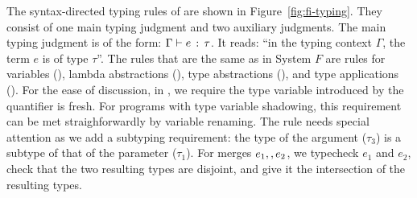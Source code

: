 The syntax-directed typing rules of \name are shown in
Figure~\ref{fig:fi-typing}. They consist of one main typing judgment and two
auxiliary judgments. The main typing judgment is of the form: $ \Gamma \vdash e \ \!:\! \ \tau $. It reads: ``in the typing context $\Gamma$, the term $e$ is of
type $\tau$''. The rules that are the same as in System $F$ are rules for
variables (), lambda abstractions (), type
abstractions (), and type applications (). For
the ease of discussion, in , we require the type variable
introduced by the quantifier is fresh. For programs with type variable
shadowing, this requirement can be met straighforwardly by variable renaming.
The rule  needs special attention as we add a subtyping
requirement: the type of the argument ($\tau_3$) is a subtype of that of the
parameter ($\tau_1$).
For merges $e_1 ,, e_2$, we typecheck $e_1$ and $e_2$, check that the two
resulting types are disjoint, and give it the intersection of the resulting
types.

